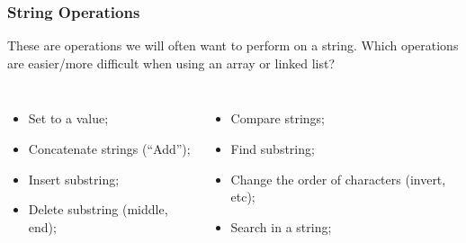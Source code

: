 \begin{frame}
  \frametitle{String Operations}
  \begin{center}
    These are operations we will often want to perform on a
    string. Which operations are easier/more difficult when using an
    array or linked list?
  \end{center}
  \begin{columns}[c]
    \begin{itemize}
    \item Set to a value;
    \item Concatenate strings (``Add'');
    \item Insert substring;
    \item Delete substring (middle, end);
    \end{itemize}
    \begin{itemize}
    \item Compare strings;
    \item Find substring;
    \item Change the order of characters (invert, etc);
    \item Search in a string;
    \end{itemize}
  \end{columns}
\end{frame}

